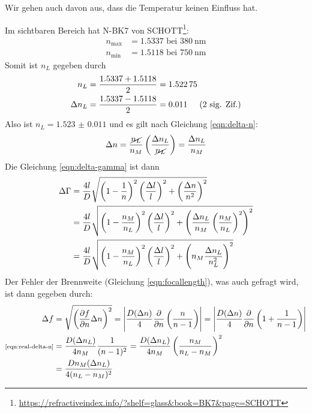 		Wir gehen auch davon aus, dass die Temperatur keinen Einfluss hat. 

		Im sichtbaren Bereich hat N-BK7 von SCHOTT\footnote{\url{https://refractiveindex.info/?shelf=glass&book=BK7&page=SCHOTT}}:
		\begin{equation}
			\begin{split}
				n_\text{max} &= \num{1.5337} \text{ bei } \SI{380}{\nano\meter} \\
				n_\text{min} &= \num{1.5118} \text{ bei } \SI{750}{\nano\meter}
			\end{split}
		\end{equation}
		Somit ist $n_L$ gegeben durch
		\begin{align}
			n_L &= \frac{\num{1,5337} + \num{1,5118}}{2} = \num{1.52275} \\
			\Delta n_L &= \frac{\num{1,5337} - \num{1,5118}}{2} = \num{0.011} \hspace{0.5cm}\text{(2 sig. Zif.)}
		\end{align}
		Also ist $n_L = \num{1.523(11)}$ und es gilt nach Gleichung \eqref{eqn:delta-n}:
		\begin{align}
			\Delta n = \frac{\cancel{n_L}}{n_M}\left(\frac{\Delta n_L}{\cancel{n_L}}\right) = \frac{\Delta n_L}{n_M}
			\label{eqn:real-delta-n}
		\end{align}
		Die Gleichung \eqref{eqn:delta-gamma} ist dann
		\begin{align}
			\Delta\Gamma &= \frac{4l}{D}\sqrt{\left(1-\frac{1}{n}\right)^2\left(\frac{\Delta l}{l}\right)^2 + \left(\frac{\Delta n}{n^2}\right)^2} \notag \\
			&= \frac{4l}{D}\sqrt{
				\left(1-\frac{n_M}{n_L}\right)^2\left(\frac{\Delta l}{l}\right)^2 
				+ \left(\frac{\Delta n_L}{n_M}\left(\frac{n_M}{n_L}\right)^2\right)^2
			} \notag \\
			&= \frac{4l}{D}\sqrt{
				\left(1-\frac{n_M}{n_L}\right)^2\left(\frac{\Delta l}{l}\right)^2 
				+ \left(n_M\frac{\Delta n_L}{n_L^2}\right)^2
			}
			\label{eqn:real-gamma-error}
		\end{align}
		Der Fehler der Brennweite (Gleichung \eqref{eqn:focallength}), was auch gefragt wird, ist dann gegeben durch:
		\begin{align}
			\Delta f &= \gausserror{f}{n} = \abs{\frac{D(\Delta n)}{4}\pdv{}{n}\left(\frac{n}{n - 1}\right)} = \abs{\frac{D(\Delta n)}{4}\pdv{}{n}\left(1+\frac{1}{n - 1}\right)} \notag \\
			{\scriptsize \eqref{eqn:real-delta-n}} &= 
				\frac{D(\Delta n_L)}{4n_M}\frac{1}{(n-1)^2} 
				= \frac{D(\Delta n_L)}{4n_M}\left(\frac{n_M}{n_L - n_M}\right)^2 \notag \\
				&=\frac{Dn_M(\Delta n_L)}{4(n_L - n_M)^2}
			\label{eqn:real-f-error}
		\end{align}
